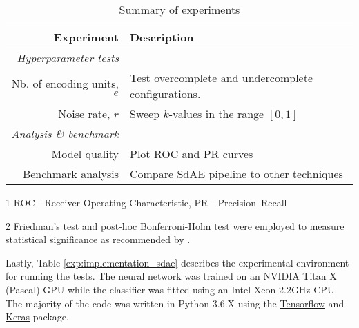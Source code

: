 \begin{table}[h]
  \centering
  \caption{Summary of experiments}
  \label{exp:setup_sdae}
  \begin{threeparttable}
      \begin{tabular}{@{}rp{}@{}}
          \toprule
          Experiment & Description                                                            \\ \midrule
          \textit{Hyperparameter tests}                                                       \\
          Nb. of encoding units, $e$    & Test overcomplete and undercomplete configurations. \\
          Noise rate, $r$               & Sweep $k$-values in the range $\left[0,1\right]$    \\ \cmidrule{1-2} 
          \textit{Analysis \& benchmark}                                                      \\
          Model quality                 & Plot ROC and PR curves\tnote{1}                     \\
          Benchmark analysis            & Compare SdAE pipeline to other techniques\tnote{2}  \\ \bottomrule
      \end{tabular}
      \begin{tablenotes}
        \footnotesize
        \item[1] ROC - Receiver Operating Characteristic, PR - Precision--Recall
        \item[2] Friedman's test \parencite{friedman1937use} and post-hoc
        Bonferroni-Holm test \parencite{holm1979simple} were employed to
        measure statistical significance as recommended by
        \cite{demsar2006statistical}.
      \end{tablenotes}
    \end{threeparttable}
\end{table}

\par Lastly, Table \ref{exp:implementation_sdae} describes the experimental
environment for running the tests. The neural network was trained on an
NVIDIA Titan X (Pascal) GPU while the classifier was fitted using an Intel
Xeon 2.2GHz CPU. The majority of the code was written in Python 3.6.X using
the \href{https://www.tensorflow.org/}{Tensorflow} and
\href{https://keras.io/}{Keras} package. 

